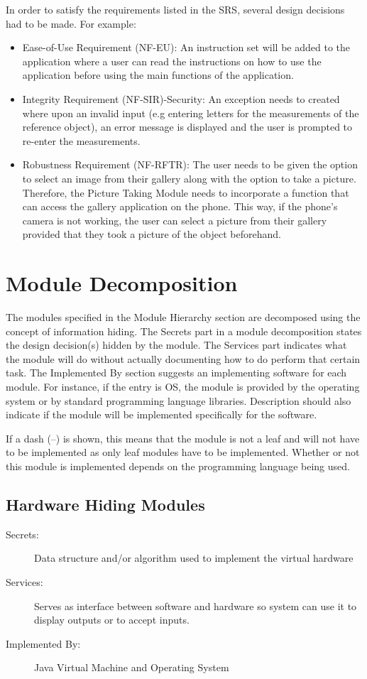 \documentclass[12pt, titlepage]{article}
\begin{document}
\noindent In order to satisfy the requirements listed in the SRS, several design decisions had to be made. For example:
\begin{itemize}
    \item Ease-of-Use Requirement (NF-EU): An instruction set will be added to the application where a user can read the instructions on how to use the application before using the main functions of the application.
    \item Integrity Requirement (NF-SIR)-Security: An exception needs to created where upon an invalid input (e.g entering letters for the measurements of the reference object), an error message is displayed and the user is prompted to re-enter the measurements.
    \item Robustness Requirement (NF-RFTR): The user needs to be given the option to select an image from their gallery along with the option to take a picture. Therefore, the Picture Taking Module needs to incorporate a function that can access the gallery application on the phone. This way, if the phone's camera is not working, the user can select a picture from their gallery provided that they took a picture of the object beforehand. 
\end{itemize}

\section{Module Decomposition} \label{SecMD}

The modules specified in the Module Hierarchy section are decomposed using the concept of  information hiding. The Secrets part in a module decomposition states the design decision(s) hidden by the module. The Services part indicates what the module will do without actually documenting how to do perform that certain task. The Implemented By section suggests an implementing software for each module. For instance, if the entry is OS, the module is provided by the operating system or by standard programming language libraries.  Description should also indicate if the module will be implemented specifically for the software.

If a dash (--) is shown, this means that the module is not a leaf and will not have to be implemented as only leaf modules have to be implemented. Whether or not this module is implemented depends on the programming language being used.

\subsection{Hardware Hiding Modules}
\begin{description}
\item[Secrets:] Data structure and/or algorithm used to implement the virtual
  hardware
\item[Services:] Serves as interface between software and hardware so system can use it to display outputs or to accept inputs.
\item[Implemented By:] Java Virtual Machine and Operating System
\end{description}
\end{document}
